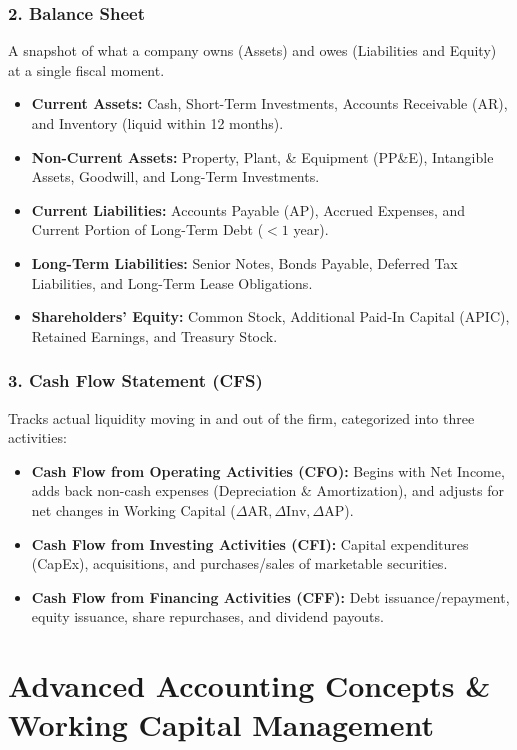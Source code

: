 \documentclass[11pt,a4paper]{article}
\begin{document}
\subsubsection{2. Balance Sheet}
A snapshot of what a company owns (Assets) and owes (Liabilities and Equity) at a single fiscal moment.
\begin{itemize}
  \item \textbf{Current Assets:} Cash, Short-Term Investments, Accounts Receivable (AR), and Inventory (liquid within 12 months).
  \item \textbf{Non-Current Assets:} Property, Plant, \& Equipment (PP\&E), Intangible Assets, Goodwill, and Long-Term Investments.
  \item \textbf{Current Liabilities:} Accounts Payable (AP), Accrued Expenses, and Current Portion of Long-Term Debt ($< 1$ year).
  \item \textbf{Long-Term Liabilities:} Senior Notes, Bonds Payable, Deferred Tax Liabilities, and Long-Term Lease Obligations.
  \item \textbf{Shareholders' Equity:} Common Stock, Additional Paid-In Capital (APIC), Retained Earnings, and Treasury Stock.
\end{itemize}

\subsubsection{3. Cash Flow Statement (CFS)}
Tracks actual liquidity moving in and out of the firm, categorized into three activities:
\begin{itemize}
  \item \textbf{Cash Flow from Operating Activities (CFO):} Begins with Net Income, adds back non-cash expenses (Depreciation \& Amortization), and adjusts for net changes in Working Capital ($\Delta\text{AR}, \Delta\text{Inv}, \Delta\text{AP}$).
  \item \textbf{Cash Flow from Investing Activities (CFI):} Capital expenditures (CapEx), acquisitions, and purchases/sales of marketable securities.
  \item \textbf{Cash Flow from Financing Activities (CFF):} Debt issuance/repayment, equity issuance, share repurchases, and dividend payouts.
\end{itemize}

\section{Advanced Accounting Concepts \& Working Capital Management}
\label{sec:adv-accounting}
\end{document}
